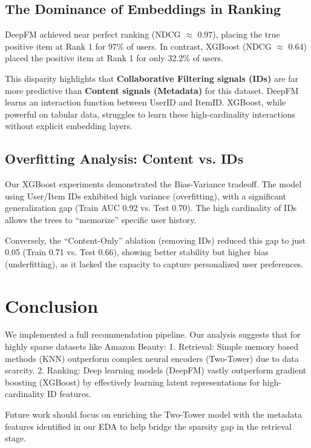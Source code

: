 \documentclass[twocolumn, 10pt, a4paper]{article}
\begin{document}
\subsection{The Dominance of Embeddings in Ranking}
DeepFM achieved near perfect ranking (NDCG $\approx$ 0.97), placing the true positive item at Rank 1 for 97\% of users. In contrast, XGBoost (NDCG $\approx$ 0.64) placed the positive item at Rank 1 for only 32.2\% of users.

This disparity highlights that \textbf{Collaborative Filtering signals (IDs)} are far more predictive than \textbf{Content signals (Metadata)} for this dataset. DeepFM learns an interaction function between UserID and ItemID. XGBoost, while powerful on tabular data, struggles to learn these high-cardinality interactions without explicit embedding layers.

\subsection{Overfitting Analysis: Content vs. IDs}
Our XGBoost experiments demonstrated the Bias-Variance tradeoff. The model using User/Item IDs exhibited high variance (overfitting), with a significant generalization gap (Train AUC 0.92 vs. Test 0.70). The high cardinality of IDs allows the trees to ``memorize'' specific user history.

Conversely, the ``Content-Only'' ablation (removing IDs) reduced this gap to just 0.05 (Train 0.71 vs. Test 0.66), showing better stability but higher bias (underfitting), as it lacked the capacity to capture personalized user preferences.


\section{Conclusion}
We implemented a full recommendation pipeline. Our analysis suggests that for highly sparse datasets like Amazon Beauty:
1.  Retrieval: Simple memory based methods (KNN) outperform complex neural encoders (Two-Tower) due to data scarcity.
2.  Ranking: Deep learning models (DeepFM) vastly outperform gradient boosting (XGBoost) by effectively learning latent representations for high-cardinality ID features.

Future work should focus on enriching the Two-Tower model with the metadata features identified in our EDA to help bridge the sparsity gap in the retrieval stage.
\end{document}
